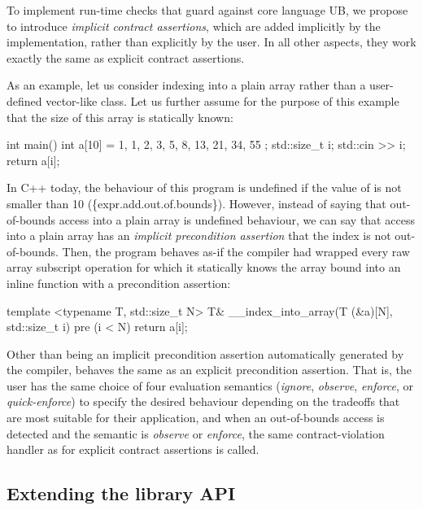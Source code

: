 To implement run-time checks that guard against core language UB, we propose to introduce \emph{implicit contract assertions}, which are added implicitly by the implementation, rather than explicitly by the user. In all other aspects, they work exactly the same as explicit contract assertions.

As an example, let us consider indexing into a plain array rather than a user-defined vector-like class. Let us further assume for the purpose of this example that the size  of this array is statically known:

\begin{codeblock}
int main() {
  int a[10] = { 1, 1, 2, 3, 5, 8, 13, 21, 34, 55 };
  std::size_t i; 
  std::cin >> i;
  return a[i];
}
\end{codeblock}

In C++ today, the behaviour of this program is undefined if the value of  is not smaller than 10 (\{expr.add.out.of.bounds\}). However, instead of saying that out-of-bounds access into a plain array is undefined behaviour, we can say that access into a plain array has an \emph{implicit precondition assertion} that the index is not out-of-bounds. Then, the program behaves as-if the compiler had wrapped every raw array subscript operation for which it statically knows the array bound  into an inline function with a precondition assertion:

\begin{codeblock}
template <typename T, std::size_t N>
T& __index_into_array(T (&a)[N], std::size_t i)
pre (i < N) {
  return a[i];
}
\end{codeblock}

Other than being an implicit precondition assertion automatically generated by the compiler,  behaves the same as an explicit precondition assertion. That is, the user has the same choice of four evaluation semantics (\emph{ignore}, \emph{observe}, \emph{enforce}, or \emph{quick-enforce}) to specify the desired behaviour depending on the tradeoffs that are most suitable for their application, and when an out-of-bounds access is detected and the semantic is \emph{observe} or \emph{enforce}, the same contract-violation handler as for explicit contract assertions is called.

\subsection{Extending the library API}
\label{library}

